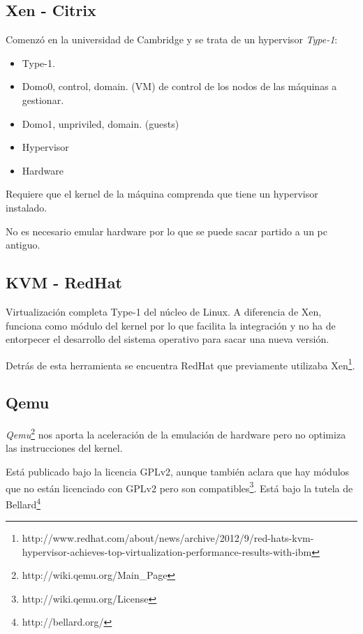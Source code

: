 \documentclass[11pt]{article}
\begin{document}
\subsection{Xen - Citrix}

Comenz\'o en la universidad de Cambridge y se trata de un hypervisor \emph{Type-1}:

\begin{itemize}
    \item Type-1.
    \item Domo0, control, domain. (VM) de control de los nodos de las m\'aquinas a gestionar.
    \item Domo1, unpriviled, domain. (guests)
    \item Hypervisor
    \item Hardware
\end{itemize}

\par Requiere que el kernel de la m\'aquina comprenda que tiene un hypervisor instalado.

\par No es necesario emular hardware por lo que se puede sacar partido a un pc antiguo.

\subsection{KVM - RedHat}

\par Virtualizaci\'on completa Type-1 del n\'ucleo de Linux. A diferencia de Xen, funciona como m\'odulo del kernel por lo que facilita la integraci\'on y no ha de entorpecer el desarrollo del sistema operativo para sacar una nueva versi\'on.

\par Detr\'as de esta herramienta se encuentra RedHat que previamente utilizaba Xen\footnote{http://www.redhat.com/about/news/archive/2012/9/red-hats-kvm-hypervisor-achieves-top-virtualization-performance-results-with-ibm}.

\subsection{Qemu}

\par \emph{Qemu}\footnote{http://wiki.qemu.org/Main\_Page} nos aporta la aceleraci\'on de la emulaci\'on de hardware pero no optimiza las instrucciones del kernel.

\par Est\'a publicado bajo la licencia GPLv2, aunque tambi\'en aclara que hay m\'odulos que no est\'an licenciado con GPLv2 pero son compatibles\footnote{http://wiki.qemu.org/License}. Est\'a bajo la tutela de Bellard\footnote{http://bellard.org/}
\end{document}
